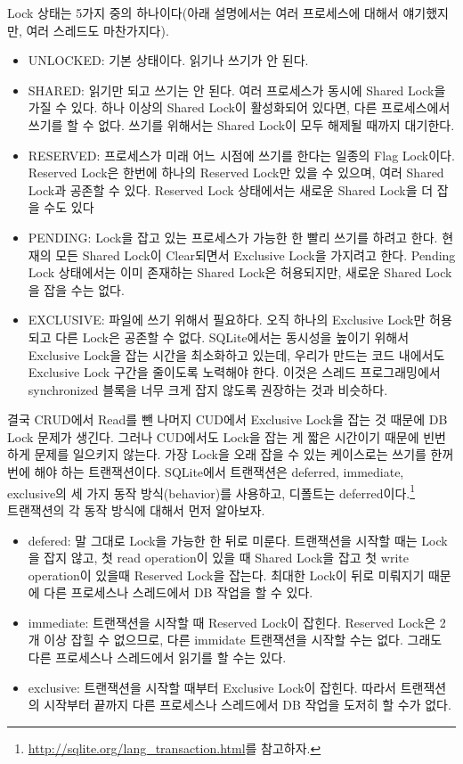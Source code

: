 Lock 상태는 5가지 중의 하나이다(아래 설명에서는 여러 프로세스에 대해서 얘기했지만, 여러 스레드도 마찬가지다).
\begin{itemize}
\item UNLOCKED: 기본 상태이다. 읽기나 쓰기가 안 된다.
\item SHARED: 읽기만 되고 쓰기는 안 된다. 여러 프로세스가 동시에 Shared Lock을 가질 수 있다. 하나 이상의 Shared Lock이 활성화되어 있다면, 다른 프로세스에서 쓰기를 할 수 없다. 쓰기를 위해서는 Shared Lock이 모두 해제될 때까지 대기한다.
\item RESERVED: 프로세스가 미래 어느 시점에 쓰기를 한다는 일종의 Flag Lock이다. Reserved Lock은 한번에 하나의 Reserved Lock만 있을 수 있으며, 여러 Shared Lock과 공존할 수 있다. Reserved Lock 상태에서는 새로운 Shared Lock을 더 잡을 수도 있다 
\item PENDING: Lock을 잡고 있는 프로세스가 가능한 한 빨리 쓰기를 하려고 한다. 현재의 모든 Shared Lock이 Clear되면서 Exclusive Lock을 가지려고 한다. Pending Lock 상태에서는 이미 존재하는 Shared Lock은 허용되지만, 새로운 Shared Lock을 잡을 수는 없다. 
\item EXCLUSIVE: 파일에 쓰기 위해서 필요하다. 오직 하나의 Exclusive Lock만 허용되고 다른 Lock은 공존할 수 없다. SQLite에서는 동시성을 높이기 위해서 Exclusive Lock을 잡는 시간을 최소화하고 있는데, 우리가 만드는 코드 내에서도 Exclusive Lock 구간을 줄이도록 노력해야 한다. 이것은 스레드 프로그래밍에서 synchronized 블록을 너무 크게 잡지 않도록 권장하는 것과 비슷하다. \\
\end{itemize}

결국 CRUD에서 Read를 뺀 나머지 CUD에서 Exclusive Lock을 잡는 것 때문에 DB Lock 문제가 생긴다. 그러나 CUD에서도 Lock을 잡는 게 짧은 시간이기 때문에 빈번하게 문제를 일으키지 않는다. 가장 Lock을 오래 잡을 수 있는 케이스로는 쓰기를 한꺼번에 해야 하는 트랜잭션이다.
SQLite에서 트랜잭션은 deferred, immediate, exclusive의 세 가지 동작 방식(behavior)를 사용하고, 디폴트는 deferred이다.\footnote{\url{http://sqlite.org/lang\_transaction.html}를 참고하자.}\\

트랜잭션의 각 동작 방식에 대해서 먼저 알아보자.
\begin{itemize}
\item defered: 말 그대로 Lock을 가능한 한 뒤로 미룬다. 트랜잭션을 시작할 때는 Lock을 잡지 않고, 첫 read operation이 있을 때 Shared Lock을 잡고 첫 write operation이 있을때 Reserved Lock을 잡는다. 최대한 Lock이 뒤로 미뤄지기 때문에 다른 프로세스나 스레드에서 DB 작업을 할 수 있다. 
\item immediate: 트랜잭션을 시작할 때 Reserved Lock이 잡힌다. Reserved Lock은 2개 이상 잡힐 수 없으므로, 다른 immidate 트랜잭션을 시작할 수는 없다. 그래도 다른 프로세스나 스레드에서 읽기를 할 수는 있다.
\item exclusive: 트랜잭션을 시작할 때부터 Exclusive Lock이 잡힌다. 따라서 트랜잭션의 시작부터 끝까지 다른 프로세스나 스레드에서 DB 작업을 도저히 할 수가 없다.
\end{itemize}

